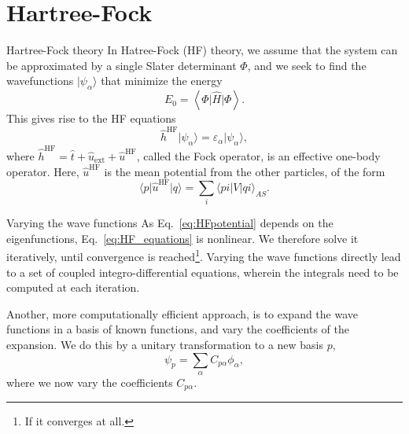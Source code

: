 \documentclass[UKenglish,aspectratio=169]{beamer}
\begin{document}
\section{Hartree-Fock}

\begin{frame}{Hartree-Fock theory}
    In Hatree-Fock (HF) theory, we assume that the system can be
    approximated by a single Slater determinant $\Phi$, and we seek
    to find the wavefunctions $\lvert \psi_\alpha \rangle$ that
    minimize the energy
    \begin{equation}
        E_0 = \left\langle \Phi \vert \hat{H} \vert \Phi \right\rangle.
    \end{equation}
    This gives rise to the HF equations
    \begin{equation}\label{eq:HF_equations}
        \hat{h}^\mathrm{HF} \lvert \psi_\alpha \rangle =
        \varepsilon_\alpha \lvert \psi_\alpha \rangle,
    \end{equation}
    where $\hat{h}^\mathrm{HF} = \hat{t} + \hat{u}_{\mathrm{ext}} +
    \hat{u}^\mathrm{HF}$, called the Fock operator, is an effective
    one-body operator.
    Here, $\hat{u}^\mathrm{HF}$ is the mean potential from the other
    particles, of the form
    \begin{equation}\label{eq:HFpotential}
        \langle p \vert \hat{u}^\mathrm{HF} \vert q \rangle =
        \sum_{i} \langle pi \vert V \vert qi \rangle_{AS}.
    \end{equation}
\end{frame}

\begin{frame}{Varying the wave functions}
    As Eq.~\eqref{eq:HFpotential} depends on the eigenfunctions,
    Eq.~\eqref{eq:HF_equations} is nonlinear.
    We therefore solve it iteratively, until convergence is
    reached\footnote{If it converges at all.}.
    Varying the wave functions directly lead to a set of coupled
    integro-differential equations, wherein the integrals need to be
    computed at each iteration.

    \bigskip

    Another, more computationally efficient approach, is to expand
    the wave functions in a basis of known functions, and vary the
    coefficients of the expansion.
    We do this by a unitary transformation to a new basis $p$,
    \begin{equation}
        \psi_p = \sum_{\alpha} C_{p\alpha} \phi_\alpha,
    \end{equation}
    where we now vary the coefficients $C_{p\alpha}$.
\end{frame}
\end{document}
